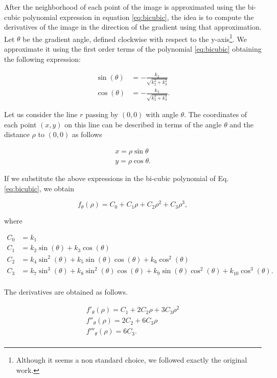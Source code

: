 \documentclass{ipol}
\numberwithin{equation}{section}
\numberwithin{table}{section}
\begin{document}
After the neighborhood of each point of the image is approximated using the bi-cubic polynomial expression in equation \ref{eq:bicubic}, the idea is to compute the derivatives of the image in the direction of the gradient using that approximation.\\

Let $\theta$ be the gradient angle, defined clockwise with respect to the y-axis\footnote{Although it seems a non standard choice, we followed exactly the original work.}. We approximate it using the first order terms of the polynomial \ref{eq:bicubic} obtaining the following expression:

\begin{align}
\label{eq:sincos}
	\sin(\theta) & = -\frac{k_2}{\sqrt{k_2^2 + k_3^2}} \nonumber \\
	\cos(\theta) & = -\frac{k_3}{\sqrt{k_2^2 + k_3^2}}.
\end{align}

Let us consider the line $r$ passing by $(0,0)$ with angle $\theta$. The coordinates of each point $(x,y)$ on this line can be described in terms of  the angle $\theta$ and the distance $\rho$ to $(0,0)$ as follows

\begin{align*}
	x = \rho\sin{\theta} \\
	y = \rho\cos{\theta}.
\end{align*}

If we substitute the above expressions in the bi-cubic polynomial of Eq. \ref{eq:bicubic}, we obtain

\begin{equation}
	f_{\theta}(\rho) = C_0 + C_1\rho + C_2\rho^2 + C_3\rho^3 ,
\end{equation}

where

\begin{align}
\label{eq:c}
	C_0 & = k_1 \nonumber \nonumber \\
	C_1 & = k_2\sin(\theta) + k_3\cos(\theta) \nonumber \\
	C_2 & = k_4\sin^2(\theta) + k_5\sin(\theta)\cos(\theta) + k_6\cos^2(\theta) \nonumber \\
	C_3 & = k_7\sin^3(\theta) + k_8\sin^2(\theta)\cos(\theta) + k_9\sin(\theta)\cos^2(\theta) + k_{10}\cos^3(\theta). \nonumber \\
\end{align}

The derivatives are obtained as follows.

\begin{align}
	f'_{\theta}(\rho) = C_1 + 2C_2\rho + 3C_3\rho^2 \nonumber \\
	f''_{\theta}(\rho) = 2C_2 + 6C_3\rho \nonumber \\
	f'''_{\theta}(\rho) = 6C_3 .\nonumber \\
\end{align}
\end{document}
